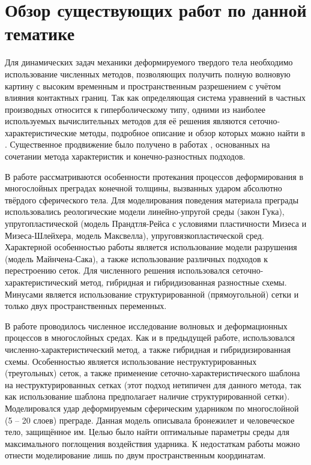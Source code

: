 \section{Обзор существующих работ по данной тематике}

Для динамических задач механики деформируемого твердого тела необходимо использование численных методов, позволяющих получить полную волновую картину с высоким временным и пространственным разрешением с учётом влияния контактных границ. Так как определяющая система уравнений в частных производных относится к гиперболическому типу, одними из наиболее используемых вычислительных методов для её решения являются сеточно-характеристические методы, подробное описание и обзор которых можно найти в \cite{magomedov}. Существенное продвижение было получено в работах \cite{chushkin}, основанных на сочетании метода характеристик и конечно-разностных подходов.

В работе \cite{petrov_chelnokov} рассматриваются особенности протекания процессов деформирования в многослойных преградах конечной толщины, вызванных ударом абсолютно твёрдого сферического тела. Для моделирования поведения материала преграды использовались реологические модели линейно-упругой среды (закон Гука), упругопластической (модель Прандтля-Рейса с условиями пластичности Мизеса и Мизеса-Шлейхера, модель Максвелла), упруговязкопластической сред. Характерной особенностью работы является использование модели разрушения (модель Майнчена-Сака), а также использование различных подходов к перестроению сеток. Для численного решения использовался сеточно-характеристический метод, гибридная и гибридизованная разностные схемы. Минусами является использование структурированной (прямоугольной) сетки и только двух пространственных переменных.

В работе \cite{matyushev_petrov} проводилось численное исследование волновых и деформационных процессов в многослойных  средах. Как и в предыдущей работе, использовался численно-характеристический метод, а также гибридная и гибридизированная схемы. Особенностью является использование неструктурированных (треугольных) сеток, а также применение сеточно-характеристического шаблона на неструктурированных сетках (этот подход нетипичен для данного метода, так как использование шаблона предполагает наличие структурированной сетки). Моделировался удар деформируемым сферическим ударником по многослойной (5 – 20 слоев) преграде. Данная модель описывала бронежилет и человеческое тело, защищённое им. Целью было найти оптимальные параметры среды для максимального поглощения воздействия ударника. К недостаткам работы можно отнести моделирование лишь по двум пространственным координатам.

